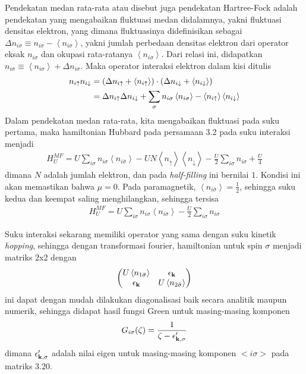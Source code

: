 Pendekatan medan rata-rata atau disebut juga pendekatan Hartree-Fock adalah pendekatan yang mengabaikan fluktuasi medan didalamnya\cite{mf}, yakni fluktuasi densitas elektron, yang dimana fluktuasinya didefinisikan sebagai $\Delta n_{i\sigma} \equiv n_{i\sigma} - \left< n_{i\sigma} \right>$, yakni jumlah perbedaan densitas elektron dari operator eksak $n_{i\sigma}$ dan okupasi rata-ratanya $\left< n_{i\sigma} \right>$. Dari relasi ini, didapatkan
$n_{i\sigma} \equiv \left< n_{i\sigma} \right> + \Delta n_{i\sigma}$. Maka operator interaksi elektron dalam kisi ditulis
\begin{align}
n_{i\uparrow}n_{i\downarrow} &= (\Delta n_{i\uparrow} + \left< n_{i\uparrow} \right>)\cdot (\Delta n_{i\downarrow} + \left< n_{i\downarrow} \right>)\notag\\
&= \Delta n_{i\uparrow} \Delta n_{i\downarrow} + \sum_\sigma n_{i\sigma} \left< n_{i\sigma} \right> - \left< n_{i\uparrow} \right> \left< n_{i\downarrow} \right>
\end{align}
Dalam pendekatan medan rata-rata, kita mengabaikan fluktuasi pada suku pertama, maka hamiltonian Hubbard pada persamaan 3.2 pada suku interaksi menjadi
\begin{align}
H_U^{MF} = U \sum_{i\sigma} n_{i\sigma} \left< n_{i\bar{\sigma}} \right> - UN \left< n_{\uparrow} \right> \left< n_{\downarrow} \right> - \frac{U}{2} \sum_{i\sigma} n_{i\sigma} + \frac{U}{4}
\end{align}
dimana $N$ adalah jumlah elektron, dan pada \textit{half-filling} ini bernilai $1$. Kondisi ini akan memastikan bahwa $\mu = 0$. Pada paramagnetik, $\left< n_{i\bar{\sigma}} \right> = \frac{1}{2}$, sehingga suku kedua dan keempat saling menghilangkan, sehingga tersisa
\begin{align}
H_U^{MF} = U \sum_{i\sigma} n_{i\sigma} \left< n_{i\bar{\sigma}} \right> - \frac{U}{2} \sum_{i\sigma} n_{i\sigma}
\end{align}

Suku interaksi sekarang memiliki operator yang sama dengan suku kinetik \textit{hopping}, sehingga dengan transformasi fourier, hamiltonian untuk spin $\sigma$ menjadi matriks 2x2 dengan 
\begin{align}
\begin{pmatrix}
U\left< n_{1\bar{\sigma}} \right> & \epsilon_{\textbf{k}}\\
\epsilon_{\textbf{k}} & U\left< n_{2\bar{\sigma}} \right>
\end{pmatrix}
\end{align}
ini dapat dengan mudah dilakukan diagonalisasi baik secara analitik maupun numerik, sehingga didapat hasil fungsi Green untuk masing-masing komponen 
\begin{align}
G_{i\sigma}(\zeta) = \frac{1}{\zeta - \epsilon'_{\textbf{k},\sigma}}
\end{align}
dimana $\epsilon'_{\textbf{k},\sigma}$ adalah nilai eigen untuk masing-masing komponen $<i\sigma>$ pada matriks 3.20.

